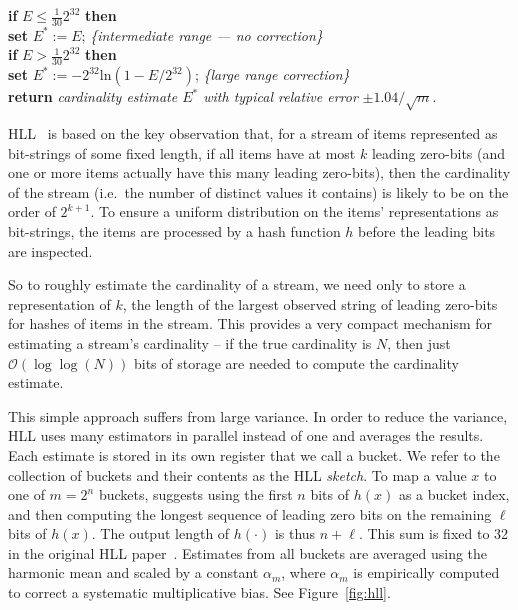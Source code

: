 \documentclass[sigconf, anonymous, dvipsnames]{acmart} %
\begin{document}
\begin{figure*}[tb!]
{{\begin{minipage}{40em}
\begin{flushleft}
\textbf{if} $E \le \frac{1}{30}2^{32}$ \textbf{then}\\
    \hspace{2em} \textbf{set} $E^*:= E$; \hfill \textit{\{intermediate range --- no correction\}}\\
\textbf{if} $E > \frac{1}{30}2^{32}$ \textbf{then}\\
    \hspace{2em}  \textbf{set} $E^*:= -2^{32}$ln$(1 - E/2^{32})$; \hfill \textit{\{large range correction\}}\\
\textbf{return} \textit{cardinality estimate $E^*$ with typical relative error} $\pm1.04/\sqrt{m}$.
\end{flushleft}
\end{minipage}
}}
\caption{The HyperLogLog Algorithm from~\cite{hll}}
\label{fig:hll}
\end{figure*}


HLL~\cite{hll} is based on the key observation that, for a stream of items represented as bit-strings of some fixed length, if all items have at most $k$ leading zero-bits (and one or more items actually have this many leading zero-bits), then the cardinality of the stream (i.e.\ the number of distinct values it contains) is likely to be on the order of $2^{k+1}$. To ensure a uniform distribution on the items' representations as bit-strings, the items are processed by a hash function $h$ before the leading bits are inspected.

So to roughly estimate the cardinality of a stream, we need only to store a representation of $k$, the length of the largest observed string of leading zero-bits for hashes of items in the stream. This provides a very compact mechanism for estimating a stream's cardinality -- if the true cardinality is $N$, then just $\mathcal{O}(\log\log(N))$ bits of storage are needed to compute the cardinality estimate.

This simple approach suffers from large variance. In order to reduce the variance, HLL uses many estimators in parallel instead of one and averages the results. Each estimate is stored in its own register that we call a bucket. We refer to the collection of buckets and their contents as the HLL \emph{sketch}. To map a value $x$ to one of $m=2^n$ buckets, \cite{loglog} suggests using the first $n$ bits of $h(x)$ as a bucket index, and then computing the longest sequence of leading zero bits on the remaining $\ell$ bits of $h(x)$. The output length of $h(\cdot)$ is thus $n+\ell$. This sum is fixed to 32 in the original HLL paper~\cite{hll}. Estimates from all buckets are averaged using the harmonic mean and scaled by a constant $\alpha_m$, where $\alpha_m$ is empirically computed to correct a systematic multiplicative bias. See Figure~\ref{fig:hll}.
\end{document}
